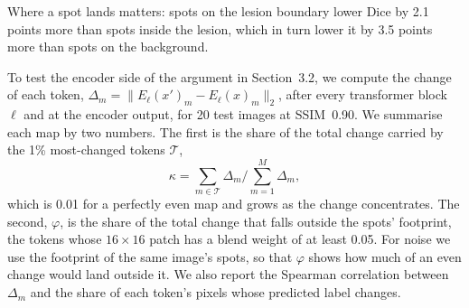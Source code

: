 

Where a spot lands matters: spots on the lesion boundary lower Dice by 2.1 points more than spots inside the
lesion, which in turn lower it by 3.5 points more than spots on the background.


To test the encoder side of the argument in Section~3.2, we compute the change of each token,
$\Delta_m = \lVert E_\ell(x')_m - E_\ell(x)_m \rVert_2$, after every transformer block $\ell$ and at the encoder
output, for 20 test images at SSIM~0.90. We summarise each map by two numbers. The first is the share of the
total change carried by the 1\% most-changed tokens $\mathcal{T}$,
\begin{equation}
  \kappa = \sum_{m \in \mathcal{T}} \Delta_m \Big/ \sum_{m=1}^{M} \Delta_m ,
\end{equation}
which is 0.01 for a perfectly even map and grows as the change concentrates. The second, $\varphi$, is the share
of the total change that falls outside the spots' footprint, the tokens whose $16\times16$ patch has a blend
weight of at least 0.05. For noise we use the footprint of the same image's spots, so that $\varphi$ shows how
much of an even change would land outside it. We also report the Spearman correlation between $\Delta_m$ and
the share of each token's pixels whose predicted label changes.

